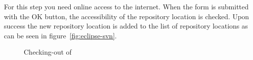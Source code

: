 For this step you need online access to the internet. When the form is
submitted with the \textsf{OK} button, the accessibility of the
repository location is checked. Upon success the new repository
location is added to the list of repository locations as can be seen
in figure~\ref{fig:eclipse-svn}.
\begin{figure}[htbp]
  \hbox{}\hfill
  \hfill
  \caption{Checking-out of \ExTeX}
\end{figure}

